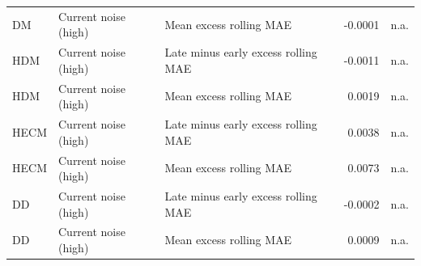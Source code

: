 \documentclass[
    a4paper,
    12pt,
    titlepage,
    bibliography=totoc,
    twoside=on,
    parskip=false,
    numbers=noenddot,
    cleardoublepage=empty,
    DIV=12,
    BCOR=12.0mm,
    headheight=36pt,
    headings=openright
]{scrreprt}
\begin{document}
\begin{longtable}{p{1.2cm}p{2.6cm}p{4.4cm}rr}
DM & Current noise (high) & Mean excess rolling MAE & -0.0001 & n.a. \\
HDM & Current noise (high) & Late minus early excess rolling MAE & -0.0011 & n.a. \\
HDM & Current noise (high) & Mean excess rolling MAE & 0.0019 & n.a. \\
HECM & Current noise (high) & Late minus early excess rolling MAE & 0.0038 & n.a. \\
HECM & Current noise (high) & Mean excess rolling MAE & 0.0073 & n.a. \\
DD & Current noise (high) & Late minus early excess rolling MAE & -0.0002 & n.a. \\
DD & Current noise (high) & Mean excess rolling MAE & 0.0009 & n.a. \\
\bottomrule
\end{longtable}
\end{document}
